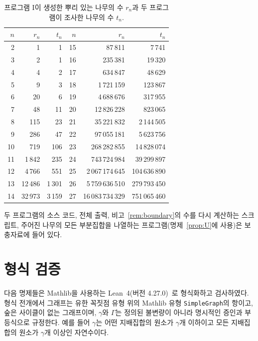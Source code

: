 \documentclass[11pt,a4paper]{article}
\theoremstyle{definition}
\begin{document}
\begin{table}[ht]
\centering
\caption{프로그램 I이 생성한 뿌리 있는 나무의 수 $r_n$과 두 프로그램이 조사한 나무의
수 $t_n$.}\label{tab:counts}
\smallskip
\begin{tabular}{rrr@{\qquad\qquad}rrr}
\hline
$n$ & $r_n$ & $t_n$ & $n$ & $r_n$ & $t_n$\\
\hline
2 & 1 & 1 & 15 & 87\,811 & 7\,741\\
3 & 2 & 1 & 16 & 235\,381 & 19\,320\\
4 & 4 & 2 & 17 & 634\,847 & 48\,629\\
5 & 9 & 3 & 18 & 1\,721\,159 & 123\,867\\
6 & 20 & 6 & 19 & 4\,688\,676 & 317\,955\\
7 & 48 & 11 & 20 & 12\,826\,228 & 823\,065\\
8 & 115 & 23 & 21 & 35\,221\,832 & 2\,144\,505\\
9 & 286 & 47 & 22 & 97\,055\,181 & 5\,623\,756\\
10 & 719 & 106 & 23 & 268\,282\,855 & 14\,828\,074\\
11 & 1\,842 & 235 & 24 & 743\,724\,984 & 39\,299\,897\\
12 & 4\,766 & 551 & 25 & 2\,067\,174\,645 & 104\,636\,890\\
13 & 12\,486 & 1\,301 & 26 & 5\,759\,636\,510 & 279\,793\,450\\
14 & 32\,973 & 3\,159 & 27 & 16\,083\,734\,329 & 751\,065\,460\\
\hline
\end{tabular}

\end{table}

두 프로그램의 소스 코드, 전체 출력, 비고~\ref{rem:boundary}의 수를 다시 계산하는
스크립트, 주어진 나무의 모든 부분집합을 나열하는 프로그램(명제~\ref{prop:U}에 사용)은
보충자료에 들어 있다.

\section{형식 검증}\label{app:lean}

다음 명제들은 Mathlib을 사용하는 Lean~4(버전 4.27.0)~\cite{Lean,Mathlib}로 형식화하고
검사하였다. 형식 전개에서 그래프는 유한 꼭짓점 유형 위의 Mathlib 유형
\texttt{SimpleGraph}의 항이고, 숲은 사이클이 없는 그래프이며, $\gamma$와 $\Gamma$는
정의된 불변량이 아니라 명시적인 증인과 부등식으로 규정한다. 예를 들어 $\gamma$는
어떤 지배집합의 원소가 $\gamma$개 이하이고 모든 지배집합의 원소가 $\gamma$개 이상인
자연수이다.
\end{document}
